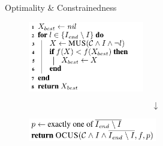 \documentclass{beamer}
\begin{document}
\begin{frame}{Optimality \& Constrainedness}
	\begin{figure}
		\includegraphics[width=0.45\textwidth]{algo_mus2.png}
	\end{figure}\pause
	{\Huge$$\downarrow$$}
	\begin{figure}
		\includegraphics[width=0.5\textwidth]{exactly_one.png}
	\end{figure}
\end{frame}
\end{document}
